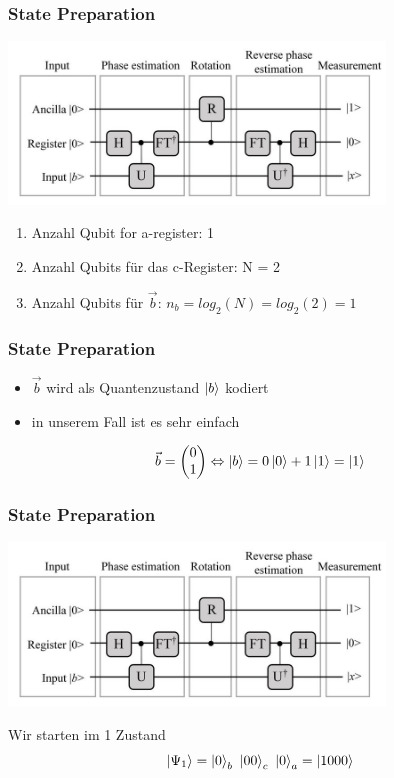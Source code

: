 \begin{frame}
    \frametitle{State Preparation}

    \begin{center}
    \includegraphics[width=10cm]{img/hhl_circuit.jpg}
    \end{center}

    \begin{enumerate}
        \item Anzahl Qubit for a-register: 1
        \item Anzahl Qubits für das c-Register: N = 2
        \item Anzahl Qubits für $\vec{b}$: $n_b = log_2(N) = log_2 (2) = 1$ 
    \end{enumerate}

\end{frame}

\begin{frame}
    \frametitle{State Preparation}

    \begin{itemize}
        \item $\vec{b}$ wird als Quantenzustand $\ket{b}$ kodiert
        \item in unserem Fall ist es sehr einfach
    \end{itemize}

    $$\vec{b} = \begin{pmatrix} 0\\ 1\\ \end{pmatrix} \Leftrightarrow \ket{b} = 0 \ket{0} + 1 \ket{1} = \ket{1}$$

\end{frame}

\begin{frame}
    \frametitle{State Preparation}

    \begin{center}
    \includegraphics[width=10cm]{img/hhl_circuit.jpg}
    \end{center}

    Wir starten im 1 Zustand
    $$\ket{\Psi_1} = \ket{0}_b\ \ket{00}_c\ \ket{0}_a = \ket{1000}$$

\end{frame}




